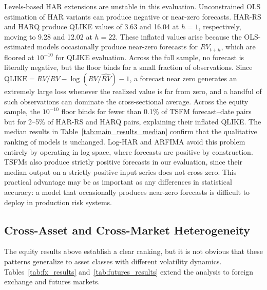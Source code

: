 \documentclass[12pt]{article}
\begin{document}
Levels-based HAR extensions are unstable in this evaluation. Unconstrained OLS estimation of HAR variants can produce negative or near-zero forecasts. HAR-RS and HARQ produce QLIKE values of 3.63 and 16.04 at $h = 1$, respectively, moving to 9.28 and 12.02 at $h = 22$. These inflated values arise because the OLS-estimated models occasionally produce near-zero forecasts for $RV_{t+h}$, which are floored at $10^{-10}$ for QLIKE evaluation. Across the full sample, no forecast is literally negative, but the floor binds for a small fraction of observations. Since $\text{QLIKE} = RV / \hat{RV} - \log(RV / \hat{RV}) - 1$, a forecast near zero generates an extremely large loss whenever the realized value is far from zero, and a handful of such observations can dominate the cross-sectional average. Across the equity sample, the $10^{-10}$ floor binds for fewer than 0.1\% of TSFM forecast--date pairs but for 2--5\% of HAR-RS and HARQ pairs, explaining their inflated QLIKE. The median results in Table~\ref{tab:main_results_median} confirm that the qualitative ranking of models is unchanged. Log-HAR and ARFIMA avoid this problem entirely by operating in log space, where forecasts are positive by construction. TSFMs also produce strictly positive forecasts in our evaluation, since their median output on a strictly positive input series does not cross zero. This practical advantage may be as important as any differences in statistical accuracy: a model that occasionally produces near-zero forecasts is difficult to deploy in production risk systems.

\subsection{Cross-Asset and Cross-Market Heterogeneity}
\label{subsec:cross_asset}

The equity results above establish a clear ranking, but it is not obvious that these patterns generalize to asset classes with different volatility dynamics. Tables~\ref{tab:fx_results} and~\ref{tab:futures_results} extend the analysis to foreign exchange and futures markets.




\end{document}
